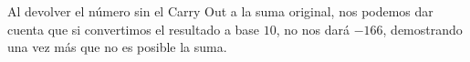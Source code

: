 \begin{frame}
\begin{solution}
\begin{enumerate}[a)]
        Al devolver el número sin el Carry Out a la suma original, nos podemos dar cuenta que si convertimos el resultado a base $10$, no nos dará $-166$, demostrando una vez más que no es posible la suma.
        
    \end{enumerate}
\end{solution}
\end{frame}